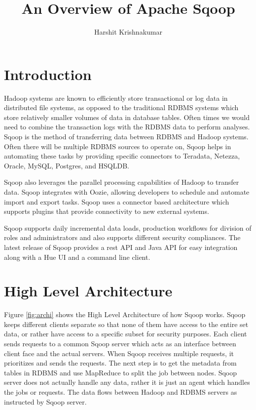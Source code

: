 \documentclass[9pt,twocolumn,twoside]{styles/osajnl}
\title{An Overview of Apache Sqoop}
\author[1,*]{Harshit Krishnakumar}
\affil[1]{School of Informatics and Computing, Bloomington, IN 47408, U.S.A.}
\affil[*]{Corresponding authors: harkrish@iu.edu, S17-IR-2014}
\begin{document}
\maketitle

\section{Introduction}

Hadoop systems are known to efficiently store transactional or log data in distributed file systems, as opposed to the traditional RDBMS systems which store relatively smaller volumes of data in database tables. Often times we would need to combine the transaction logs with the RDBMS data to perform analyses. Sqoop is the method of transferring data between RDBMS and Hadoop systems. Often there will be multiple RDBMS sources to operate on, Sqoop helps in automating these tasks by providing specific connectors to Teradata, Netezza, Oracle, MySQL, Postgres, and HSQLDB. 

Sqoop also leverages the parallel processing capabilities of Hadoop to transfer data. Sqoop integrates with Oozie, allowing developers to schedule and automate import and export tasks. Sqoop uses a connector based architecture which supports plugins that provide connectivity to new external systems.

Sqoop supports daily incremental data loads, production workflows for division of roles and administrators and also supports different security compliances. The latest release of Sqoop provides a rest API and Java API for easy integration along with a Hue UI and a command line client.\cite{cloudera}

\section{High Level Architecture}

Figure \ref{fig:archi} shows the High Level Architecture of how Sqoop works. Sqoop keeps different clients separate so that none of them have access to the entire set data, or rather have access to a specific subset for security purposes. Each client sends requests to a common Sqoop server which acts as an interface between client face and the actual servers. When Sqoop receives multiple requests, it prioritizes and sends the requests. The next step is to get the metadata from tables in RDBMS and use MapReduce to split the job between nodes. Sqoop server does not actually handle any data, rather it is just an agent which handles the jobs or requests. The data flows between Hadoop and RDBMS servers as instructed by Sqoop server\cite{sqoop-blog}.
\end{document}

